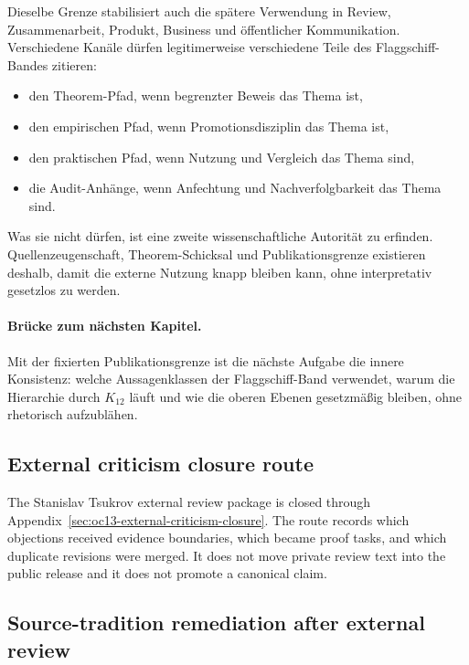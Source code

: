 Dieselbe Grenze stabilisiert auch die spätere Verwendung in Review,
Zusammenarbeit, Produkt, Business und öffentlicher Kommunikation.
Verschiedene Kanäle dürfen legitimerweise verschiedene Teile des
Flaggschiff-Bandes zitieren:

\begin{itemize}
\item den Theorem-Pfad, wenn begrenzter Beweis das Thema ist,
\item den empirischen Pfad, wenn Promotionsdisziplin das Thema ist,
\item den praktischen Pfad, wenn Nutzung und Vergleich das Thema sind,
\item die Audit-Anhänge, wenn Anfechtung und Nachverfolgbarkeit das Thema sind.
\end{itemize}

Was sie nicht dürfen, ist eine zweite wissenschaftliche Autorität zu erfinden.
Quellenzeugenschaft, Theorem-Schicksal und Publikationsgrenze existieren
deshalb, damit die externe Nutzung knapp bleiben kann, ohne interpretativ
gesetzlos zu werden.

\paragraph{Brücke zum nächsten Kapitel.}
Mit der fixierten Publikationsgrenze ist die nächste Aufgabe die innere
Konsistenz: welche Aussagenklassen der Flaggschiff-Band verwendet, warum die
Hierarchie durch \(K_{12}\) läuft und wie die oberen Ebenen gesetzmäßig
bleiben, ohne rhetorisch aufzublähen.

\clearpage

\subsection{External criticism closure route}
\label{sec:oc13-source-audit-external-criticism-closure}

The Stanislav Tsukrov external review package is closed through Appendix~\ref{sec:oc13-external-criticism-closure}. The route records which objections received evidence boundaries, which became proof tasks, and which duplicate revisions were merged. It does not move private review text into the public release and it does not promote a canonical claim.


\subsection{Source-tradition remediation after external review}
\label{sec:oc13-source-tradition-remediation-v3}

